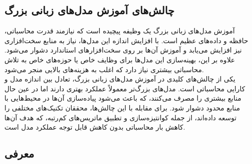 

\subsection{چالش‌های آموزش مدل‌های زبانی بزرگ}

آموزش مدل‌های زبانی بزرگ یک وظیفه پیچیده است که نیازمند قدرت محاسباتی، حافظه و داده‌های عظیم است. با افزایش اندازه این مدل‌ها، نیاز به منابع سخت‌افزاری نیز افزایش می‌یابد و آموزش آن‌ها بر روی سخت‌افزارهای استاندارد دشوار می‌شود. علاوه بر این، بهینه‌سازی این مدل‌ها برای وظایف خاص یا حوزه‌های خاص به تلاش محاسباتی بیشتری نیاز دارد که اغلب به هزینه‌های بالایی منجر می‌شود.
\\
یکی از چالش‌های کلیدی در آموزش مدل‌های زبانی بزرگ، تعادل بین اندازه مدل و کارایی محاسباتی است. مدل‌های بزرگ‌تر معمولاً عملکرد بهتری دارند اما در عین حال منابع بیشتری را مصرف می‌کنند، که باعث می‌شود پیاده‌سازی آن‌ها در محیط‌هایی با منابع محدود دشوار شود. برای مقابله با این چالش‌ها، محققان تکنیک‌های مختلفی را توسعه داده‌اند، از جمله کوانتیزه‌سازی و تطبیق ماتریس‌های کم‌رتبه، که هدف آن‌ها کاهش بار محاسباتی بدون کاهش قابل توجه عملکرد مدل است.

\subsection{معرفی }

